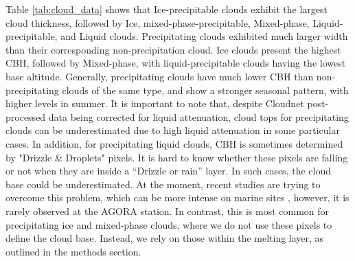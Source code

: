 Table \ref{tab:cloud_data} shows that Ice-precipitable clouds exhibit the largest cloud thickness, followed by Ice, mixed-phase-precipitable, Mixed-phase, Liquid-precipitable, and Liquid clouds. Precipitating clouds exhibited much larger width than their corresponding non-precipitation cloud. Ice clouds present the highest CBH, followed by Mixed-phase, with liquid-precipitable clouds having the lowest base altitude. Generally, precipitating clouds have much lower CBH than non-precipitating clouds of the same type, and show a stronger seasonal pattern, with higher levels in summer. 
It is important to note that, despite Cloudnet post-processed data being corrected for liquid attenuation, cloud tops for precipitating clouds can be underestimated due to high liquid attenuation in some particular cases. In addition, for precipitating liquid clouds, CBH is sometimes determined by "Drizzle \& Droplets" pixels. It is hard to know whether these pixels are falling or not when they are inside a “Drizzle or rain” layer. In such cases, the cloud base could be underestimated. At the moment, recent studies are trying to overcome this problem, which can be more intense on marine sites \citep{roschkeDiscriminatingDrizzleRain2024}, however, it is rarely observed at the AGORA station. In contrast, this is most common for precipitating ice and mixed-phase clouds, where we do not use these pixels to define the cloud base. Instead, we rely on those within the melting layer, as outlined in the methods section.

